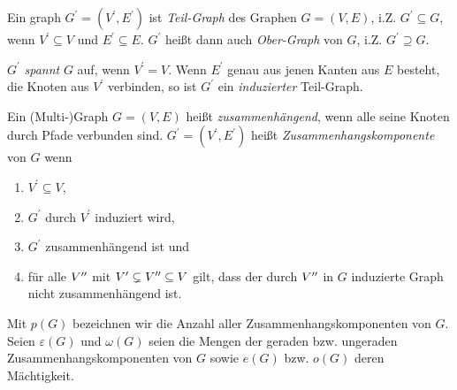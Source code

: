         \begin{definition} \label{def:sub_graphs}

            Ein graph $G^\prime = (V^\prime, E^\prime)$ ist \textit{Teil-Graph} des Graphen $G = (V, E)$, i.Z. $G^\prime \subseteq G$, wenn $V^\prime \subseteq V$ und $E^\prime \subseteq E$.
            $G^\prime$ heißt dann auch \textit{Ober-Graph} von $G$, i.Z. $G^\prime \supseteq G$.

            $G^\prime$ \textit{spannt} $G$ auf, wenn $V^\prime = V$.
            Wenn $E^\prime$ genau aus jenen Kanten aus $E$ besteht, die Knoten aus $V^\prime$ verbinden, so ist $G^\prime$ ein \textit{induzierter} Teil-Graph.

        \end{definition}

        \begin{definition} \label{def:graph_components}

            Ein (Multi-)Graph $G = (V, E)$ heißt \textit{zusammenhängend}, wenn alle seine Knoten durch Pfade verbunden sind.
            $G^\prime = (V^\prime, E^\prime)$ heißt \textit{Zusammenhangskomponente} von $G$ wenn

            \begin{enumerate}[label = \arabic*.]
                \item $V^\prime \subseteq V$,
                \item $G^\prime$ durch $V^\prime$ induziert wird,
                \item $G^\prime$ zusammenhängend ist und
                \item für alle $V^{\prime \prime}$ mit $V^\prime \subsetneq V^{\prime \prime} \subseteq V$ gilt, dass der durch $V^{\prime \prime}$ in $G$ induzierte Graph nicht zusammenhängend ist.
            \end{enumerate}

            Mit $p(G)$ bezeichnen wir die Anzahl aller Zusammenhangskomponenten von $G$.
            Seien $\varepsilon(G)$ und $\omega(G)$ seien die Mengen der geraden bzw. ungeraden Zusammenhangskomponenten von $G$ sowie $e(G)$ bzw. $o(G)$ deren Mächtigkeit.

        \end{definition}

